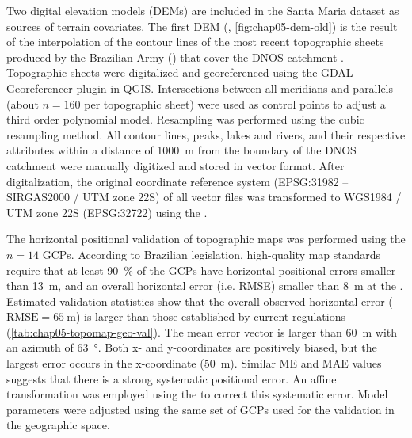 Two digital elevation models (DEMs) are included in the Santa Maria dataset as sources of terrain covariates. 
The first DEM (\demNew, \autoref{fig:chap05-dem-old}) is the result of the interpolation of the contour lines 
of the most recent topographic sheets produced by the Brazilian Army () that cover the DNOS 
catchment \cite{DSG1980, DSG1992, DSG1992a}. Topographic sheets were digitalized and georeferenced using the 
GDAL Georeferencer plugin in QGIS. Intersections between all meridians and parallels (about $n = 160$ per 
topographic sheet) were used as control points to adjust a third order polynomial model. Resampling was 
performed using the cubic resampling method. All contour lines, peaks, lakes and rivers, and their respective 
attributes within a distance of \SI{1000}{\m} from the boundary of the DNOS catchment were manually digitized 
and stored in vector format. After digitalization, the original coordinate reference system (EPSG:31982 -- 
SIRGAS2000 / UTM zone 22S) of all vector files was transformed to WGS1984 / UTM zone 22S (EPSG:32722) using 
the  \cite{BivandEtAl2013a}.

The horizontal positional validation of topographic maps was performed using the $n = 14$ GCPs. According to 
Brazilian legislation, high-quality map standards require that at least \SI{90}{\percent} of the GCPs have 
horizontal positional errors smaller than \SI{13}{\metre}, and an overall horizontal error (i.e. RMSE) smaller 
than \SI{8}{\metre} at the  \cite{Brasil1984}. Estimated validation statistics show that the 
overall observed horizontal error ($\text{RMSE} = \SI{65}{\m}$) is larger than those established by current 
regulations (\autoref{tab:chap05-topomap-geo-val}). The mean error vector is larger than \SI{60}{\metre} with 
an azimuth of \SI{63}{\degree}. Both x- and y-coordinates are positively biased, but the largest error occurs 
in the x-coordinate (\SI{50}{\metre}). Similar ME and MAE values suggests that there is a strong systematic 
positional error. An affine transformation was employed using the  \cite{Carrillo2012} 
to correct this systematic error. Model parameters were adjusted using the same set of GCPs used for the 
validation in the geographic space.


